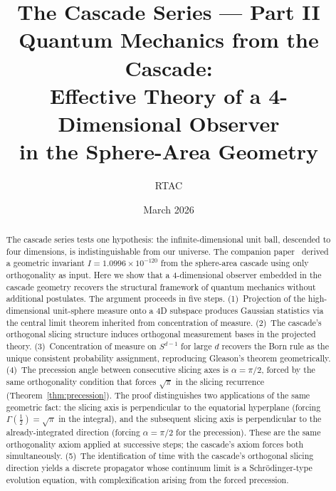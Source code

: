 \documentclass[12pt,a4paper]{article}
\title{The Cascade Series --- Part II\\[0.5em]
\large Quantum Mechanics from the Cascade:\\
Effective Theory of a 4-Dimensional Observer\\
in the Sphere-Area Geometry}
\author{RTAC}
\date{March 2026}
\begin{document}
\maketitle

\begin{abstract}
The cascade series tests one hypothesis: the infinite-dimensional unit ball, descended to
four dimensions, is indistinguishable from our universe. The companion paper~\cite{paperI}
derived a geometric invariant $I = 1.0996\times 10^{-120}$ from the sphere-area cascade
using only orthogonality as input. Here we show that a 4-dimensional observer embedded in
the cascade geometry recovers the structural framework of quantum mechanics without
additional postulates. The argument proceeds in five steps. (1)~Projection of the
high-dimensional unit-sphere measure onto a 4D subspace produces Gaussian statistics via
the central limit theorem inherited from concentration of measure. (2)~The cascade's
orthogonal slicing structure induces orthogonal measurement bases in the projected theory.
(3)~Concentration of measure on $S^{d-1}$ for large $d$ recovers the Born rule as the
unique consistent probability assignment, reproducing Gleason's theorem geometrically.
(4)~The precession angle between consecutive slicing axes is $\alpha=\pi/2$, forced by the
same orthogonality condition that forces $\sqrt{\pi}$ in the slicing recurrence
(Theorem~\ref{thm:precession}). The proof distinguishes two applications of the same
geometric fact: the slicing axis is perpendicular to the equatorial hyperplane (forcing
$\Gamma(\tfrac{1}{2})=\sqrt{\pi}$ in the integral), and the subsequent slicing axis is
perpendicular to the already-integrated direction (forcing $\alpha=\pi/2$ for the
precession). These are the same orthogonality axiom applied at successive steps; the
cascade's axiom forces both simultaneously. (5)~The identification of time with the
cascade's orthogonal slicing direction yields a discrete propagator whose continuum limit
is a Schr\"{o}dinger-type evolution equation, with complexification arising from the forced
precession.


\end{abstract}
\end{document}
